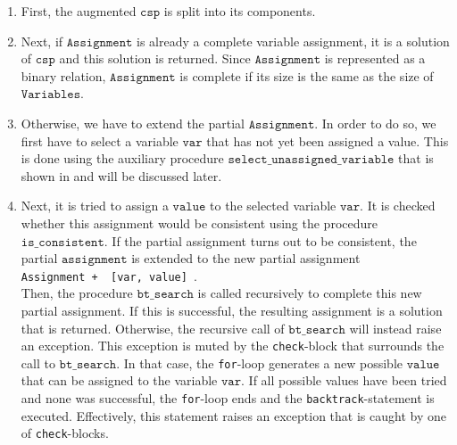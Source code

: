 \begin{enumerate}
\item First, the augmented $\mathtt{csp}$ is split into its components.
\item Next, if $\mathtt{Assignment}$ is already a complete variable assignment, it is a solution of
      $\mathtt{csp}$ and this solution is returned.  Since $\mathtt{Assignment}$ is represented as a binary
      relation, $\mathtt{Assignment}$ is complete if its size is the same as the size of $\mathtt{Variables}$.
\item Otherwise, we have to extend the partial $\mathtt{Assignment}$.  In order to do so, we first have to
      select a variable $\mathtt{var}$ that has not yet been assigned a value.  This is done using the
      auxiliary procedure $\mathtt{select\_unassigned\_variable}$ that is shown in
       and will be discussed later.
\item Next, it is tried to assign a $\mathtt{value}$ to the selected variable $\mathtt{var}$.  It is checked
      whether this assignment would be consistent using the procedure $\mathtt{is\_consistent}$.
      If the partial assignment turns out to be consistent, the partial $\mathtt{assignment}$
      is extended to the new partial assignment
      \\[0.2cm]
      \hspace*{1.3cm}
      \texttt{Assignment + { [var, value] }}.
      \\[0.2cm]
      Then, the procedure $\mathtt{bt\_search}$ is called recursively to complete this new partial assignment.
      If this is successful, the resulting assignment is a solution that is returned.  Otherwise,
      the recursive call of $\mathtt{bt\_search}$ will instead raise an exception.  This exception is muted 
      by the \texttt{check}-block that surrounds the call to $\mathtt{bt\_search}$.  In that case, the
      \texttt{for}-loop generates a new possible $\mathtt{value}$ that can be assigned to the variable
      $\mathtt{var}$.  If all possible values have been tried and none was successful, the \texttt{for}-loop
      ends and the \texttt{backtrack}-statement is executed.  Effectively, this statement raises an exception
      that is caught by one of \texttt{check}-blocks.
\end{enumerate}


